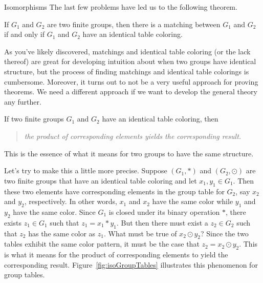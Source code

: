 \begin{section}{Isomorphisms}
The last few problems have led us to the following theorem.

\begin{theorem}
If $G_1$ and $G_2$ are two finite groups, then there is a matching between $G_1$ and $G_2$ if and only if $G_1$ and $G_2$ have an identical table coloring.
\end{theorem}

As you've likely discovered, matchings and identical table coloring (or the lack thereof) are great for developing intuition about when two groups have identical structure, but the process of finding matchings and identical table colorings is cumbersome.  Moreover, it turns out to not be a very useful approach for proving theorems.  We need a different approach if we want to develop the general theory any further. 

If two finite groups $G_1$ and $G_2$ have an identical table coloring, then
\begin{quotation}
\emph{the product of corresponding elements yields the corresponding result.}
\end{quotation}
This is the essence of what it means for two groups to have the same structure.  

Let's try to make this a little more precise.  Suppose $(G_1,*)$ and $(G_2,\odot)$ are two finite groups that have an identical table coloring and let $x_1,y_1\in G_1$.  Then these two elements have corresponding elements in the group table for $G_2$, say $x_2$ and $y_2$, respectively.  In other words, $x_1$ and $x_2$ have the same color while $y_1$ and $y_2$ have the same color.  Since $G_1$ is closed under its binary operation $*$, there exists $z_1\in G_1$ such that $z_1=x_1*y_1$.  But then there must exist a $z_2\in G_2$ such that $z_2$ has the same color as $z_1$.  What must be true of $x_2\odot y_2$?  Since the two tables exhibit the same color pattern, it must be the case that $z_2=x_2\odot y_2$.  This is what it means for the product of corresponding elements to yield the corresponding result.  Figure~\ref{fig:isoGroupTables} illustrates this phenomenon for group tables.


\end{section}
